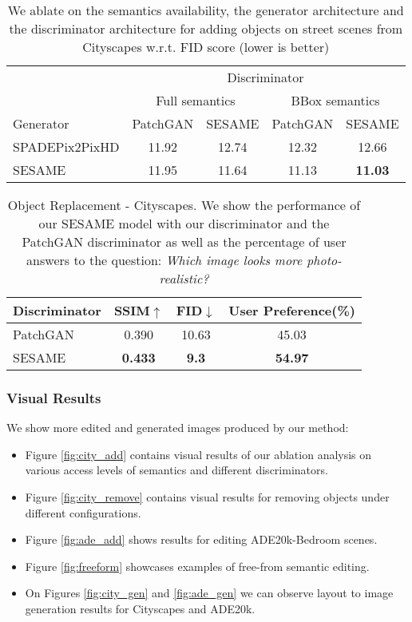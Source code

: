 \documentclass[runningheads]{llncs}
\begin{document}
\begin{table}[t]
\centering
\caption{We ablate on the semantics availability, the generator architecture and the discriminator architecture for adding objects on street scenes from Cityscapes w.r.t. FID score (lower is better) }
\label{table:ablation}
\begin{tabular}{l|cc|cc}
\multicolumn{1}{l}{} &  \multicolumn{4}{c}{Discriminator} \\
\multicolumn{1}{l}{} &  \multicolumn{2}{c|}{Full semantics} & \multicolumn{2}{c}{BBox semantics} \\
\cline{2-5}
Generator & PatchGAN & SESAME & PatchGAN & SESAME \\
\hline
SPADEPix2PixHD & 11.92 & 12.74 & 12.32 & 12.66 \\ 
SESAME & 11.95 & 11.64 & 11.13 & \textbf{11.03} \\
\end{tabular}
\end{table}

\begin{table*}
\centering
\caption{Object Replacement - Cityscapes. We show the performance of our SESAME model with our discriminator and the PatchGAN\cite{isola2017image,park2019SPADE} discriminator as well as the percentage of user answers to the question: \textit{Which image looks more photo-realistic?}}
\begin{tabular}{l|cc|c}
Discriminator & SSIM$\uparrow$ & FID$\downarrow$ & User Preference(\%) \\
\hline
PatchGAN &  0.390 & 10.63 & 45.03 \\
SESAME & \textbf{0.433} & \textbf{9.3} & \textbf{54.97} \\
\end{tabular}
\label{table:replacement}
\end{table*}



\subsubsection{Visual Results}

We show more edited and generated images produced by our method:

\begin{itemize}
    \item Figure \ref{fig:city_add} contains visual results of our ablation analysis on various access levels of semantics and different discriminators.
    \item Figure \ref{fig:city_remove} contains visual results for removing objects under different configurations.   
    \item Figure \ref{fig:ade_add} shows results for editing ADE20k-Bedroom scenes\cite{zhou2017scene,zhou2016semantic}.
    \item Figure \ref{fig:freeform} showcases examples of free-from semantic editing.   
    \item On Figures \ref{fig:city_gen} and \ref{fig:ade_gen} we can observe layout to image generation results for Cityscapes and ADE20k.   
\end{itemize}
\end{document}
